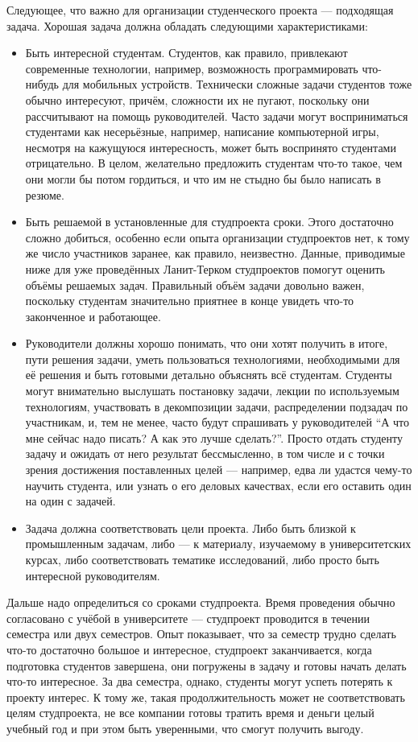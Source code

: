 \documentclass[a5paper]{article}
\begin{document}
Следующее, что важно для организации студенческого проекта --- подходящая задача. Хорошая задача должна обладать следующими характеристиками:
\begin{itemize}
  \item Быть интересной студентам. Студентов, как правило, привлекают современные технологии, например, возможность программировать что-нибудь для мобильных устройств. Технически сложные задачи студентов тоже обычно интересуют, причём, сложности их не пугают, поскольку они рассчитывают на помощь руководителей. Часто задачи могут восприниматься студентами как несерьёзные, например, написание компьютерной игры, несмотря на кажущуюся интересность, может быть воспринято студентами отрицательно. В целом, желательно предложить студентам что-то такое, чем они могли бы потом гордиться, и что им не стыдно бы было написать в резюме.
	\item Быть решаемой в установленные для студпроекта сроки. Этого достаточно сложно добиться, особенно если опыта организации студпроектов нет, к тому же число участников заранее, как правило, неизвестно. Данные, приводимые ниже для уже проведённых Ланит-Терком студпроектов помогут оценить объёмы решаемых задач. Правильный объём задачи довольно важен, поскольку студентам значительно приятнее в конце увидеть что-то законченное и работающее.
	\item Руководители должны хорошо понимать, что они хотят получить в итоге, пути решения задачи, уметь пользоваться технологиями, необходимыми для её решения и быть готовыми детально объяснять всё студентам. Студенты могут внимательно выслушать постановку задачи, лекции по используемым технологиям, участвовать в декомпозиции задачи, распределении подзадач по участникам, и, тем не менее, часто будут спрашивать у руководителей ``А что мне сейчас надо писать? А как это лучше сделать?''. Просто отдать студенту задачу и ожидать от него результат бессмысленно, в том числе и с точки зрения достижения поставленных целей --- например, едва ли удастся чему-то научить студента, или узнать о его деловых качествах, если его оставить один на один с задачей.
	\item Задача должна соответствовать цели проекта. Либо быть близкой к промышленным задачам, либо --- к материалу, изучаемому в университетских курсах, либо соответствовать тематике исследований, либо просто быть интересной руководителям.
\end{itemize}

Дальше надо определиться со сроками студпроекта. Время проведения обычно согласовано с учёбой в университете --- студпроект проводится в течении семестра или двух семестров. Опыт показывает, что за семестр трудно сделать что-то достаточно большое и интересное, студпроект заканчивается, когда подготовка студентов завершена, они погружены в задачу и готовы начать делать что-то интересное. За два семестра, однако, студенты могут успеть потерять к проекту интерес. К тому же, такая продолжительность может не соответствовать целям студпроекта, не все компании готовы тратить время и деньги целый учебный год и при этом быть уверенными, что смогут получить выгоду.
\end{document}
